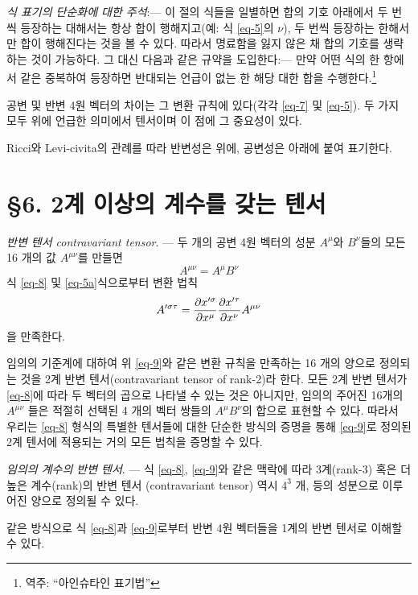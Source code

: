 \emph{식 표기의 단순화에 대한 주석}:--- 
이 절의 식들을 일별하면 합의 기호 아래에서 두 번씩 등장하는  대해서는 항상 합이 행해지고(예: 식 \eqref{eq-5}의 \Index{} $\nu$), 두 번씩 등장하는  한해서만 합이 행해진다는 것을 볼 수 있다. 따라서 명료함을 잃지 않은 채 합의 기호를 생략하는 것이 가능하다. 그 대신 다음과 같은 규약을 도입한다:--- 만약 어떤 식의 한 항에서 같은 \Index\이 중복하여 등장하면 반대되는 언급이 없는 한 해당  대한 합을 수행한다.\footnote{역주: ``아인슈타인 표기법''}\par
공변 및 반변 4원 벡터의 차이는 그 변환 규칙에 있다(각각 \eqref{eq-7} 및 \eqref{eq-5}). 두 가지 모두 위에 언급한 의미에서 텐서이며 이 점에 그 중요성이 있다.\par
Ricci와 Levi-civita의 관례를 따라 반변성은 \Index\을 위에, 공변성은 \Index\을 아래에 붙여 표기한다.

\section*{\S 6. 2계 이상의 계수를 갖는 텐서}
\emph{반변 텐서 contravariant tensor}. --- 
두 개의 공변 4원 벡터의 성분 $A^\mu$와 $B^\nu$들의 모든 16 개의 값 $A^{\mu\nu}$를 만들면
\begin{equation} \label{eq-8}
	A^{\mu\nu} = A^\mu B^\nu
\end{equation}
식 \eqref{eq-8} 및 \eqref{eq-5a}식으로부터 변환 법칙
\begin{equation} \label{eq-9}
	A^{\prime\sigma\tau} = {\frac{{\partial}{x^{\prime\sigma}}}{{\partial}{x^\mu}}} {\frac{{\partial}{x^{\prime\tau}}}{{\partial}{x^\nu}}} A^{\mu\nu}
\end{equation}
을 만족한다. 

임의의 기준계에 대하여 위 \eqref{eq-9}와 같은 변환 규칙을 만족하는 16 개의 양으로 정의되는 것을 2계 반변 텐서(contravariant tensor of rank-2)라 한다. 모든 2계 반변 텐서가 \eqref{eq-8}에 따라 두 벡터의 곱으로 나타낼 수 있는 것은 아니지만, 임의의 주어진 16개의 $A^{\mu\nu}$ 들은 적절히 선택된 4 개의 벡터 쌍들의 $A^{\mu} B^{\nu}$의 합으로 표현할 수 있다.
따라서 우리는 \eqref{eq-8} 형식의 특별한 텐서들에 대한 단순한 방식의 증명을 통해 \eqref{eq-9}로 정의된 2계 텐서에 적용되는 거의 모든 법칙을 증명할 수 있다.

\emph{임의의 계수의 반변 텐서}. --- 
식 \eqref{eq-8}, \eqref{eq-9}와 같은 맥락에 따라 3계(rank-3) 혹은 더 높은 계수(rank)의 반변 텐서 (contravariant tensor) 역시  $4^3$ 개, 등의 성분으로 이루어진 양으로 정의될 수 있다.\par
같은 방식으로 식 \eqref{eq-8}과 \eqref{eq-9}로부터 반변 4원 벡터들을 1계의 반변 텐서로 이해할 수 있다.

